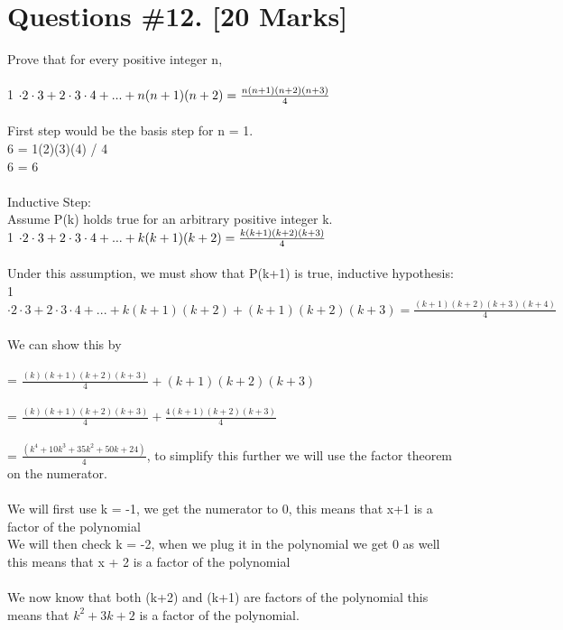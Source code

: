 \documentclass{article}
\begin{document}
\section{Questions \#12. [20 Marks]} 
Prove that for every positive integer n, \\ \\
1 $\cdot 2 \cdot 3 + 2 \cdot 3 \cdot 4 + ... + n(n+1)(n+2) = {\Large \frac{n(n+1)(n+2)(n+3)}{4}}$ \\\\
First step would be the basis step for n = 1. \\
6 = 1(2)(3)(4) / 4  \\
6 = 6 \\\\
Inductive Step: \\
Assume P(k) holds true for an arbitrary positive integer k. \\ 
1 $\cdot 2 \cdot 3 + 2 \cdot 3 \cdot 4 + ... + k(k+1)(k+2) = {\Large \frac{k(k+1)(k+2)(k+3)}{4}}$ \\\\
Under this assumption, we must show that P(k+1) is true, inductive hypothesis: \\
1 $\cdot 2 \cdot 3 + 2 \cdot 3 \cdot 4 + ... + k(k+1)(k+2)+ (k+1)(k+2)(k+3) = { \frac{(k+1)(k+2)(k+3)(k+4)}{4}}$ \\\\
We can show this by \\\\
 = {$ \frac{(k)(k+1)(k+2)(k+3)}{4} + (k+1)(k+2)(k+3)$} \\\\
 = {$ \frac{(k)(k+1)(k+2)(k+3)}{4} +  \frac{4(k+1)(k+2)(k+3)}{4}$} \\\\
 = {$ \frac{(k^4 + 10k^3 + 35k^2 + 50k + 24)}{4}$}, to simplify this further we will use the factor theorem on the numerator. \\\\
 We will first use k = -1, we get the numerator to 0, this means that x+1 is a factor of the polynomial \\
 We will then check k = -2, when we plug it in the polynomial we get 0 as well this means that x + 2 is a factor of the polynomial \\\\
We now know that both (k+2) and (k+1) are factors of the polynomial this means that $k^2 + 3k + 2$ is a factor of the polynomial. \\\\
\end{document}
